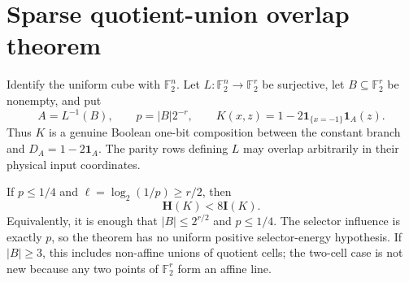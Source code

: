 \section*{Sparse quotient-union overlap theorem}

Identify the uniform cube with $\mathbb F_2^n$.  Let
$L:\mathbb F_2^n\to\mathbb F_2^r$ be surjective, let
$B\subseteq\mathbb F_2^r$ be nonempty, and put
\[
 A=L^{-1}(B),\qquad p=|B|2^{-r},\qquad
 K(x,z)=1-2\mathbf 1_{\{x=-1\}}\mathbf 1_A(z).
\]
Thus $K$ is a genuine Boolean one-bit composition between the
constant branch and $D_A=1-2\mathbf1_A$.  The parity rows defining
$L$ may overlap arbitrarily in their physical input coordinates.

\begin{theorem}
If $p\le1/4$ and $\ell=\log_2(1/p)\ge r/2$, then
\[
 \mathbf H(K)<8\mathbf I(K).
\]
Equivalently, it is enough that $|B|\le2^{r/2}$ and $p\le1/4$.
The selector influence is exactly $p$, so the theorem has no
uniform positive selector-energy hypothesis.  If $|B|\ge3$, this
includes non-affine unions of quotient cells; the two-cell case is
not new because any two points of $\mathbb F_2^r$ form an affine line.
\end{theorem}

